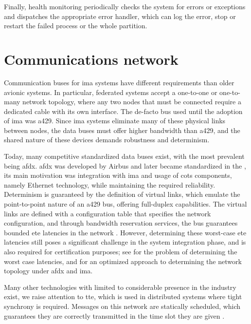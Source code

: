 \documentclass[main.tex]{subfiles}
\begin{document}
Finally, health monitoring periodically checks the system for errors or exceptions and dispatches the appropriate error handler, which can log the error, stop or restart the failed process or the whole partition.


\section{Communications network}

Communication buses for \gls{ima} systems have different requirements than older avionic systems.
In particular, federated systems accept a one-to-one or one-to-many network topology, where any two nodes that must be connected require a dedicated cable with its own interface.
The de-facto bus used until the adoption of \gls{ima} was \gls{a429}.
Since \gls{ima} systems eliminate many of these physical links between nodes, the data buses must offer higher bandwidth than \gls{a429}, and the shared nature of these devices demands robustness and determinism.

Today, many competitive standardized data buses exist, with the most prevalent being \gls{afdx}.
\Gls{afdx} was developed by Airbus and later became standardized in the  \cite{arinc664}, its main motivation was integration with \gls{ima} and usage of \gls{cots} components, namely Ethernet technology, while maintaining the required reliability.
Determinism is guaranteed by the definition of virtual links, which emulate the point-to-point nature of an \gls{a429} bus, offering full-duplex capabilities.
The virtual links are defined with a configuration table that specifies the network configuration, and through bandwidth reservation services, the bus guarantees bounded \gls{ete} latencies in the network \cite{gwaltney2006comparison}.
However, determining these worst-case \gls{ete} latencies still poses a significant challenge in the system integration phase, and is also required for certification purposes; see \textcite{benammar2017forward} for the problem of determining the worst case latencies, and \textcite{annighofer2013supporting} for an optimized approach to determining the network topology under \gls{afdx} and \gls{ima}.

Many other technologies with limited to considerable presence in the industry exist, we raise attention to \gls{tte}, which is used in distributed systems where tight synchrony is required.
Messages on this network are statically scheduled, which guarantees they are correctly transmitted in the time slot they are given \cite{beji2014smt, robati2016model}.
\end{document}
